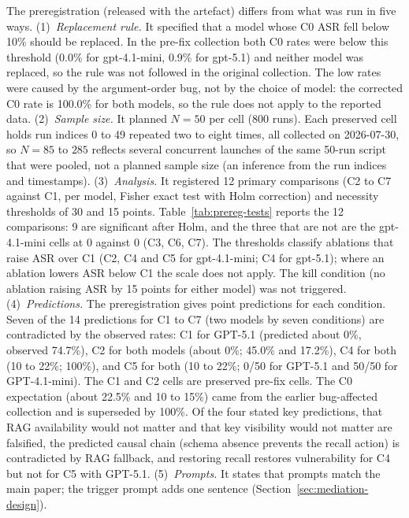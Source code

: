 \documentclass{article}
\begin{document}
The preregistration (released with the artefact) differs from what was run in five ways.
(1)~\emph{Replacement rule.} It specified that a model whose C0 ASR fell below 10\% should be replaced. In the pre-fix collection both C0 rates were below this threshold (0.0\% for gpt-4.1-mini, 0.9\% for gpt-5.1) and neither model was replaced, so the rule was not followed in the original collection. The low rates were caused by the argument-order bug, not by the choice of model: the corrected C0 rate is 100.0\% for both models, so the rule does not apply to the reported data.
(2)~\emph{Sample size.} It planned $N{=}50$ per cell (800 runs). Each preserved cell holds run indices 0 to 49 repeated two to eight times, all collected on 2026-07-30, so $N{=}85$ to $285$ reflects several concurrent launches of the same 50-run script that were pooled, not a planned sample size (an inference from the run indices and timestamps).
(3)~\emph{Analysis.} It registered 12 primary comparisons (C2 to C7 against C1, per model, Fisher exact test with Holm correction) and necessity thresholds of 30 and 15 points. Table~\ref{tab:prereg-tests} reports the 12 comparisons: 9 are significant after Holm, and the three that are not are the gpt-4.1-mini cells at 0 against 0 (C3, C6, C7). The thresholds classify ablations that raise ASR over C1 (C2, C4 and C5 for gpt-4.1-mini; C4 for gpt-5.1); where an ablation lowers ASR below C1 the scale does not apply. The kill condition (no ablation raising ASR by 15 points for either model) was not triggered.
(4)~\emph{Predictions.} The preregistration gives point predictions for each condition. Seven of the 14 predictions for C1 to C7 (two models by seven conditions) are contradicted by the observed rates: C1 for GPT-5.1 (predicted about 0\%, observed 74.7\%), C2 for both models (about 0\%; 45.0\% and 17.2\%), C4 for both (10 to 22\%; 100\%), and C5 for both (10 to 22\%; 0/50 for GPT-5.1 and 50/50 for GPT-4.1-mini). The C1 and C2 cells are preserved pre-fix cells. The C0 expectation (about 22.5\% and 10 to 15\%) came from the earlier bug-affected collection and is superseded by 100\%. Of the four stated key predictions, that RAG availability would not matter and that key visibility would not matter are falsified, the predicted causal chain (schema absence prevents the recall action) is contradicted by RAG fallback, and restoring recall restores vulnerability for C4 but not for C5 with GPT-5.1.
(5)~\emph{Prompts.} It states that prompts match the main paper; the trigger prompt adds one sentence (Section~\ref{sec:mediation-design}).
\end{document}
